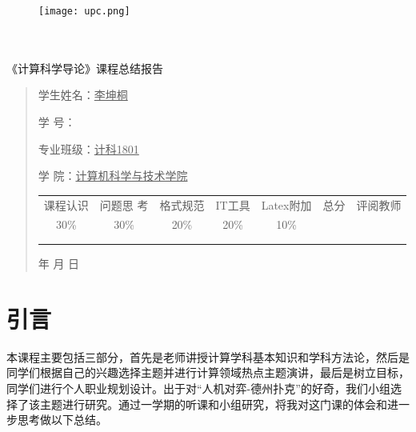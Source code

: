 \documentclass{article}
\renewcommand{\today}{\number\year 年 \number\month 月 \number\day 日}
\begin{document}
\begin{figure}
    \centering
    \texttt{[image: upc.png]}

    \label{figupc}
\end{figure}

	\begin{center}
		\quad \\
		\quad \\
		\heiti \fontsize{45}{17} \quad \quad \quad 
		\vskip 1.5cm
		\heiti {} 《计算科学导论》课程总结报告
	\end{center}
	\vskip 2.0cm
		
	\begin{quotation}
		\doublespacing
		
        \par\setlength\parindent{7em}
		\quad 

		学生姓名：\underline{\qquad  李坤桐 \qquad \qquad}

		学\hspace{0.61cm} 号：\underline{\qquad}
		
		专业班级：\underline{\qquad 计科1801 \qquad  }
		
        学\hspace{0.61cm} 院：\underline{计算机科学与技术学院}
		\vskip 2cm
		\centering
		\begin{table}[h]
            \centering 
            \begin{tabular}{|c|c|c|c|c|c|c|}
                \hline
                课程认识 & 问题思 考 & 格式规范  & IT工具  & Latex附加  & 总分 & 评阅教师 \\
                30\% & 30\% & 20\% & 20\% & 10\% &  &  \\
                \hline
                 & & & & & &\\
                & & & & & &\\
                \hline
            \end{tabular}
        \end{table}
		\vskip 2cm
		\today
	\end{quotation}

\thispagestyle{empty}
\newpage
\setcounter{page}{1}
\section{引言}
本课程主要包括三部分，首先是老师讲授计算学科基本知识和学科方法论，然后是同学们根据自己的兴趣选择主题并进行计算领域热点主题演讲，最后是树立目标，同学们进行个人职业规划设计。出于对“人机对弈-德州扑克”的好奇，我们小组选择了该主题进行研究。通过一学期的听课和小组研究，将我对这门课的体会和进一步思考做以下总结。
\end{document}
